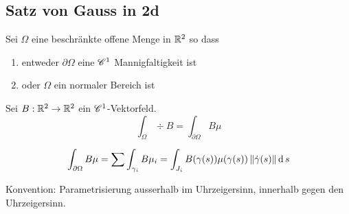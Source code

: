 \subsection{Satz von Gauss in 2d}
\begin{Sat}
  Sei $\Omega$ eine beschränkte offene Menge in $\mathbb{R}^2$ so dass
  \begin{enumerate}
    \item entweder $\partial\Omega$ eine $\mathscr{C}^1$ Mannigfaltigkeit ist
    \item oder $\Omega$ ein normaler Bereich ist
  \end{enumerate}
  Sei $B:\mathbb{R}^2\rightarrow\mathbb{R}^2$ ein $\mathscr{C}^1$-Vektorfeld.
  \[\int_\Omega\div B=\int_{\partial\Omega}B\mu\]
\end{Sat}
\begin{Bem}
  \[\int_{\partial\Omega}B\mu=\sum\int_{\gamma_i}B\mu_i=\int_{J_i}B(\gamma(s))\mu(\gamma(s))\left\| \dot\gamma(s) \right\|\operatorname{d} s\]
\end{Bem}
\begin{Bem}
  Konvention: Parametrisierung ausserhalb im Uhrzeigersinn, innerhalb gegen den Uhrzeigersinn.
\end{Bem}
